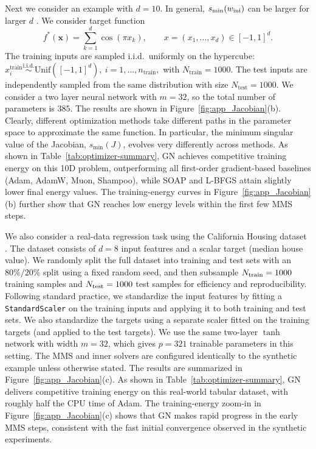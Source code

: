 \documentclass[twoside,11pt]{article}
\newcommand{\x}{{\bm x}}
\begin{document}
Next we consider an example with $d = 10$. In general,  $s_{\min}(w_{\rm ini})$ can be larger for larger $d$ \citep{du2018gradient}. We consider target function 
\begin{equation}\label{HighD_sy}
f^\ast(\x)  =  \textstyle \sum_{k=1}^d \cos(\pi x_k), 
\qquad x=(x_1,\ldots,x_d)\in[-1,1]^d.
\end{equation}
The training inputs are sampled i.i.d.\ uniformly on the hypercube:
\(
x_i^{\mathrm{train}} \overset{\mathrm{i.i.d.}}{\sim}\mathrm{Unif}([-1,1]^d),~i=1,\dots,n_{\mathrm{train}},
\)
with $N_{\mathrm{train}} = 1000$.  The test inputs are independently sampled from the same distribution with size $N_{\mathrm{test}}=1000$. We consider a two layer neural network with $m = 32$, so the total number of parameters is $385$. The results are shown in Figure~\ref{fig:app_Jacobian}(b). Clearly, different optimization methods take different paths in the parameter space to approximate the same function. In particular, the minimum singular value of the Jacobian, $s_{\min}(J)$, evolves very differently across methods. As shown in Table~\ref{tab:optimizer-summary}, GN achieves competitive training energy on this 10D problem, outperforming all first-order gradient-based baselines (Adam, AdamW, Muon, Shampoo), while SOAP and L-BFGS attain slightly lower final energy values. The training-energy curves in Figure~\ref{fig:app_Jacobian}(b) further show that GN reaches low energy levels within the first few MMS steps.




We also consider a real-data regression task using the California Housing dataset \citep{pace1997sparse}. 
The dataset consists of $d=8$ input features and a scalar target (median house value). 
We randomly split the full dataset into training and test sets with an $80\%/20\%$ split using a fixed random seed, and then subsample $N_{\rm train}=1000$ training samples and $N_{\rm test}=1000$ test samples for efficiency and reproducibility. 
Following standard practice, we standardize the input features by fitting a \texttt{StandardScaler} on the training inputs and applying it to both training and test sets. 
We also standardize the targets using a separate scaler fitted on the training targets (and applied to the test targets). 
We use the same two-layer $\tanh$ network with width $m=32$, which gives $p=321$ trainable parameters in this setting. 
The MMS and inner solvers are configured identically to the synthetic example unless otherwise stated. The results are summarized in Figure~\ref{fig:app_Jacobian}(c). As shown in Table~\ref{tab:optimizer-summary}, GN delivers competitive training energy on this real-world tabular dataset, with roughly half the CPU time of Adam. The training-energy zoom-in in Figure~\ref{fig:app_Jacobian}(c) shows that GN makes rapid progress in the early MMS steps, consistent with the fast initial convergence observed in the synthetic experiments.
\end{document}
